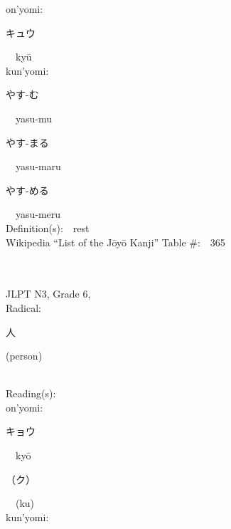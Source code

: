 \begin{multicols}{2}
{\hspace*{1em}}on'yomi:\ \ \\
{\hspace*{2em}}{\begin{CJK}{UTF8}{min} キュウ \end{CJK}}\ \ ky\=u\ \ \\
{\hspace*{1em}}kun'yomi:\ \ \\
{\hspace*{2em}}{\begin{CJK}{UTF8}{min} やす-む \end{CJK}}\ \ yasu-mu\ \ \\
{\hspace*{2em}}{\begin{CJK}{UTF8}{min} やす-まる \end{CJK}}\ \ yasu-maru\ \ \\
{\hspace*{2em}}{\begin{CJK}{UTF8}{min} やす-める \end{CJK}}\ \ yasu-meru\ \ \\
Definition(s):\ \ rest \\
Wikipedia ``List of the J\=oy\=o Kanji'' Table \#:\ \ 365 \\
\ \ \\
{\fontsize{34pt}{40pt}  }\ \ \\  %
{JLPT N3, Grade 6, \\Radical:\ \ {\begin{CJK}{UTF8}{min} 人 \end{CJK}} (person) } \\
Reading(s):\ \ \\
{\hspace*{1em}}on'yomi:\ \ \\
{\hspace*{2em}}{\begin{CJK}{UTF8}{min} キョウ \end{CJK}}\ \ ky\=o\ \ \\
{\hspace*{2em}}{\begin{CJK}{UTF8}{min} （ク） \end{CJK}}\ \ (ku)\ \ \\
{\hspace*{1em}}kun'yomi:\ \ \\

\end{multicols}
